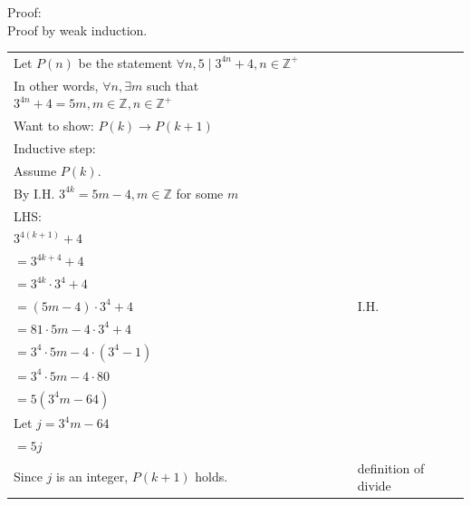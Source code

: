 \documentclass[12pt]{exam}
\begin{document}
\begin{solution}
	Proof:\\
	Proof by weak induction.\\
	\begin{tabular}{ll}
		Let $P(n)$ be the statement $\forall n, 5\mid 3^{4n}+4, n\in \mathbb{Z}^+$                         \\
		In other words, $\forall n, \exists m$ such that $3^{4n}+4=5m, m\in \mathbb{Z}, n\in \mathbb{Z}^+$ \\
		Want to show: $P(k)\rightarrow P(k+1)$                                                             \\
		Inductive step:                                                                                    \\
		Assume $P(k)$.                                                                                     \\
		By I.H. $3^{4k}=5m-4, m\in \mathbb{Z}$ for some $m$                                                \\
		LHS:                                                                                               \\
		$3^{4(k+1)}+4$                                                                                     \\
		$=3^{4k+4}+4$                                                                                      \\
		$=3^{4k}\cdot 3^4+4$                                                                               \\
		$=(5m-4)\cdot 3^4+4$                          & I.H.                                               \\
		$=81\cdot 5m-4\cdot 3^4+4$                                                                         \\
		$=3^4\cdot 5m -4\cdot (3^4-1)$                                                                     \\
		$=3^4\cdot 5m -4\cdot 80$                                                                          \\
		$=5(3^4m-64)$                                                                                      \\
		Let  $j=3^4m-64$                                                                                   \\
		$=5j$                                                                                              \\
		Since $j$ is an integer, $P(k+1)$ holds.      & definition of divide                               \\



\end{tabular}
\end{solution}
\end{document}
